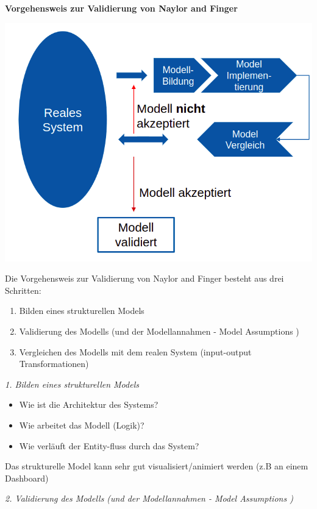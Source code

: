 \textbf{Vorgehensweis zur Validierung von Naylor and Finger} \\
\newline
\begin{minipage}[t]{0.\textwidth}
\centering
\includegraphics[width=0.9\linewidth]{images/ansatz-der-validierung.png}
\end{minipage}
Die Vorgehensweis zur Validierung von Naylor and Finger besteht aus drei Schritten:
\begin{enumerate}
    \item Bilden eines strukturellen Models
    \item Validierung des Modells (und der Modellannahmen - Model Assumptions )
    \item Vergleichen des Modells mit dem realen System (input-output Transformationen)
\end{enumerate}


\textit{1. Bilden eines strukturellen Models}

\begin{itemize}
    \item Wie ist die Architektur des Systems? 
    \item Wie arbeitet das Modell (Logik)?
    \item Wie verläuft der Entity-fluss durch das System? 
\end{itemize}
Das strukturelle Model kann sehr gut visualisiert/animiert werden (z.B an einem Dashboard)
\newline


\textit{2.  Validierung des Modells (und der Modellannahmen - Model Assumptions )}

